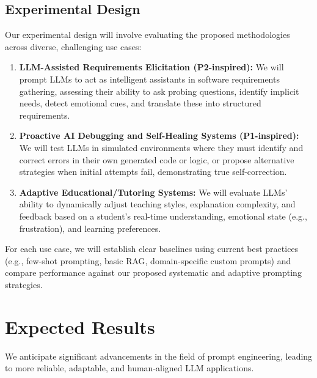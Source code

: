 \documentclass{article}
\begin{document}
\subsection{Experimental Design}
Our experimental design will involve evaluating the proposed methodologies across diverse, challenging use cases:
\begin{enumerate}[noitemsep]
    \item \textbf{LLM-Assisted Requirements Elicitation (P2-inspired):} We will prompt LLMs to act as intelligent assistants in software requirements gathering, assessing their ability to ask probing questions, identify implicit needs, detect emotional cues, and translate these into structured requirements.
    \item \textbf{Proactive AI Debugging and Self-Healing Systems (P1-inspired):} We will test LLMs in simulated environments where they must identify and correct errors in their own generated code or logic, or propose alternative strategies when initial attempts fail, demonstrating true self-correction.
    \item \textbf{Adaptive Educational/Tutoring Systems:} We will evaluate LLMs' ability to dynamically adjust teaching styles, explanation complexity, and feedback based on a student's real-time understanding, emotional state (e.g., frustration), and learning preferences.
\end{enumerate}
For each use case, we will establish clear baselines using current best practices (e.g., few-shot prompting, basic RAG, domain-specific custom prompts) and compare performance against our proposed systematic and adaptive prompting strategies.

\section{Expected Results}
We anticipate significant advancements in the field of prompt engineering, leading to more reliable, adaptable, and human-aligned LLM applications.
\end{document}
